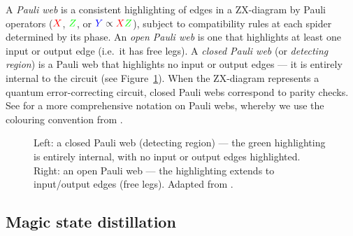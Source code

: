 \documentclass[a4paper,onecolumn,11pt,accepted=2026-06-10]{quantumarticle}
\begin{document}
A \textit{Pauli web} \cite{Bombin_2024, rodatz2025faulttoleranceconstruction} is a consistent highlighting of edges in a ZX-diagram by Pauli operators (${\color{red}X}$, ${\color{green}Z}$, or ${\color{blue}Y} \propto {\color{red}X}{\color{green}Z}$), subject to compatibility rules at each spider determined by its phase. An \textit{open Pauli web} is one that highlights at least one input or output edge (i.e.\ it has free legs). A \textit{closed Pauli web} (or \textit{detecting region}) is a Pauli web that highlights no input or output edges --- it is entirely internal to the circuit (see Figure~\ref{fig:pauli_web_types}). When the ZX-diagram represents a quantum error-correcting circuit, closed Pauli webs correspond to parity checks. See \cite{Bombin_2024,rodatz2025faulttoleranceconstruction} for a more comprehensive notation on Pauli webs, whereby we use the colouring convention from \cite{rodatz2025faulttoleranceconstruction}.

\begin{figure}[h]
\centering
    \caption{Left: a closed Pauli web (detecting region) --- the green highlighting is entirely internal, with no input or output edges highlighted. Right: an open Pauli web --- the highlighting extends to input/output edges (free legs). Adapted from \cite{Bombin_2024, rodatz2025faulttoleranceconstruction}.}
    \label{fig:pauli_web_types}
\end{figure}

\subsection{Magic state distillation}
\label{sec:msd}
\end{document}
